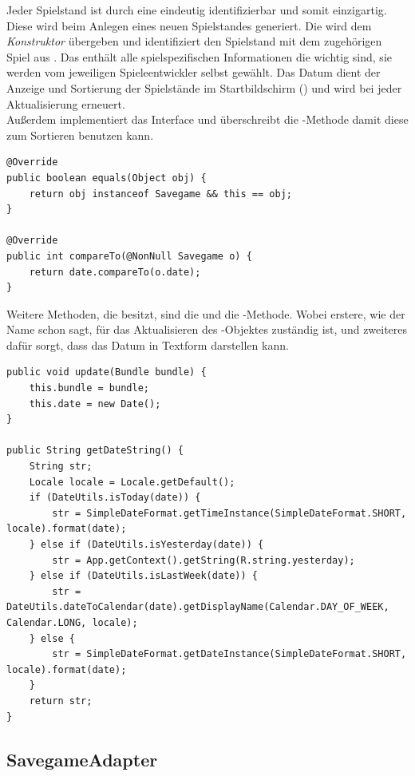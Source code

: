 Jeder Spielstand ist durch eine  eindeutig identifizierbar und somit
einzigartig. Diese wird beim Anlegen eines neuen Spielstandes generiert.  Die
 wird dem \emph{Konstruktor} übergeben und identifiziert den
Spielstand mit dem zugehörigen Spiel aus .  Das 
enthält alle spielspezifischen Informationen die wichtig sind, sie werden vom
jeweiligen Spieleentwickler selbst gewählt. Das Datum dient der Anzeige und
Sortierung der Spielstände im Startbildschirm () und wird bei jeder
Aktualisierung erneuert.\\ Außerdem implementiert  das Interface
 und überschreibt die -Methode damit
 diese zum Sortieren benutzen kann.

\begin{lstlisting}[caption={Savegame compareTo() \& equals()},captionpos=b]
@Override
public boolean equals(Object obj) {
	return obj instanceof Savegame && this == obj;
}

@Override
public int compareTo(@NonNull Savegame o) {
	return date.compareTo(o.date);
}
\end{lstlisting}

Weitere Methoden, die  besitzt, sind die  und die
-Methode. Wobei erstere, wie der Name schon sagt, für das
Aktualisieren des -Objektes zuständig ist, und zweiteres dafür
sorgt, dass  das Datum in Textform darstellen kann.

\begin{lstlisting}[caption={Savegame update() \& getDateString()},captionpos=b]
public void update(Bundle bundle) {
	this.bundle = bundle;
	this.date = new Date();
}

public String getDateString() {
	String str;
	Locale locale = Locale.getDefault();
	if (DateUtils.isToday(date)) {
		str = SimpleDateFormat.getTimeInstance(SimpleDateFormat.SHORT, locale).format(date);
	} else if (DateUtils.isYesterday(date)) {
		str = App.getContext().getString(R.string.yesterday);
	} else if (DateUtils.isLastWeek(date)) {
		str = DateUtils.dateToCalendar(date).getDisplayName(Calendar.DAY_OF_WEEK, Calendar.LONG, locale);
	} else {
		str = SimpleDateFormat.getDateInstance(SimpleDateFormat.SHORT, locale).format(date);
	}
	return str;
}
\end{lstlisting}

\subsection{SavegameAdapter}

